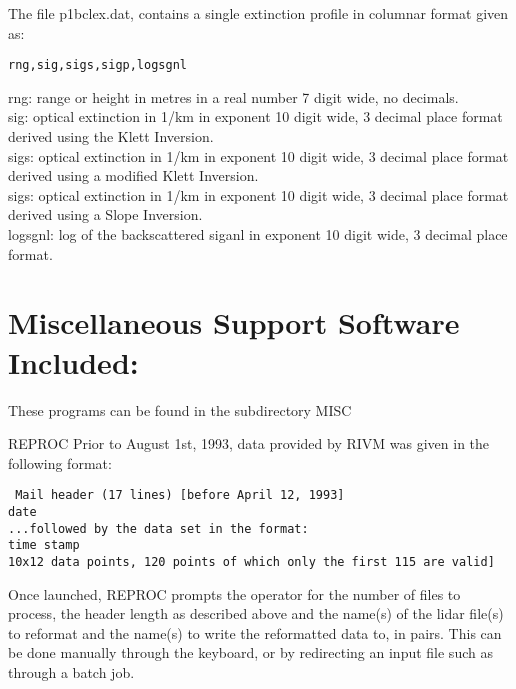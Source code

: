 \noindent
The file p1bclex.dat, contains a single extinction profile
in columnar format given as:

\begin{center}
	{\tt rng,sig,sigs,sigp,logsgnl}
\end{center}

\noindent
rng: range or height in metres in a real number 7 digit wide, no decimals.\\
sig: optical extinction in 1/km in exponent 
     10 digit wide, 3 decimal place format derived using the Klett Inversion.\\
sigs: optical extinction in 1/km in exponent 
     10 digit wide, 3 decimal place format derived using a 
      modified Klett Inversion.\\
sigs: optical extinction in 1/km in exponent 
     10 digit wide, 3 decimal place format derived using a 
     Slope Inversion.\\
logsgnl: log of the backscattered siganl in exponent 
         10 digit wide, 3 decimal place format.\\

\section{Miscellaneous Support Software Included:}

\noindent
These programs can be found in the subdirectory MISC

\noindent
REPROC	Prior to August 1st, 1993, data provided by RIVM
        was given in the following format:

\noindent
\begin{center}{\tt	
	Mail header (17 lines) [before April 12, 1993]\\
	date \\

	...followed by the data set in the format:\\

	time stamp\\
	10x12 data points, 120 points of which only the first
	115 are valid]}
\end{center}

Once launched, REPROC prompts the operator for the number of files
to process, the header length as described above and the name(s) 
of the lidar file(s) to reformat and the name(s) to write the 
reformatted data to, in pairs. This can be done manually through
the keyboard, or by redirecting an input file such as through a
batch job.

